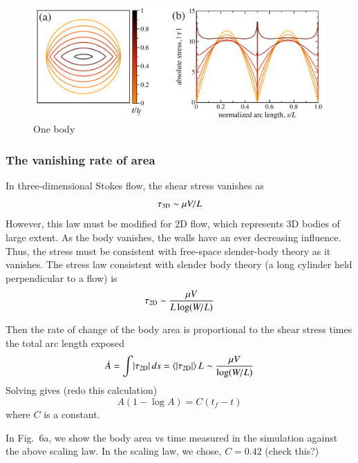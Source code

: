 \documentclass[preprint, 10pt]{elsarticle}
\begin{document}
\begin{figure}%
\begin{center}
\includegraphics[width = 0.8 \textwidth]{./figs/shrink_intface.pdf}
\caption{One body}
\label{}
\end{center}
\end{figure}

\subsubsection{The vanishing rate of area}
In three-dimensional Stokes flow, the shear stress vanishes as
\begin{equation}
\tau_{3\text{D}} \sim \mu V/L
\end{equation}
However, this law must be modified for 2D flow, which represents 3D bodies of large extent. As the body vanishes, the walls have an ever decreasing influence. Thus, the stress must be consistent with free-space slender-body theory as it vanishes. The stress law consistent with slender body theory (a long cylinder held perpendicular to a flow) is
\begin{equation}
\tau_{2\text{D}} \sim \frac{\mu V}{L \log(W/L)}
\end{equation}

Then the rate of change of the body area is proportional to the shear stress times the total arc length exposed
\begin{equation}
\dot{A} = \int \lvert \tau_{2\text{D}} \rvert \, ds = \left< \lvert \tau_{2\text{D}} \rvert \right> L
\sim \frac{\mu V}{\log(W/L)}
\end{equation}
Solving gives (redo this calculation)
\begin{equation}
A (1 - \log A) = C (t_f - t)
\end{equation}
where $C$ is a constant.

In Fig.~6a, we show the body area vs time measured in the simulation against the above scaling law. In the scaling law, we chose, $C = 0.42$ (check this?)
\end{document}
